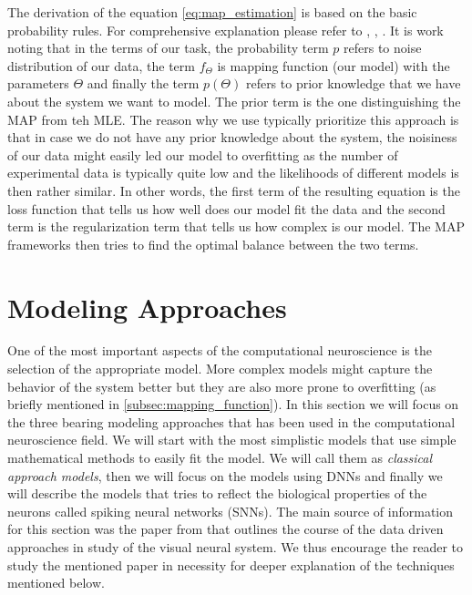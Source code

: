 The derivation of the equation \ref{eq:map_estimation} is based on the basic probability
rules. For comprehensive explanation please refer to \citet{alpaydin2020introduction}, 
\citet{wu2006complete}, \citet{annurev:/content/journals/10.1146/annurev-vision-091718-014731}.
It is work noting that in the terms of our task, the probability term $p$ refers to 
noise distribution of our data, the term $f_{\Theta}$ is mapping function (our model) 
with the parameters $\Theta$ and finally the term $p(\Theta)$ refers to prior knowledge 
that we have about the system we want to model. The prior term is the one distinguishing
the MAP from teh MLE. The reason why we use typically prioritize this approach is that in
case we do not have any prior knowledge about the system, the noisiness of our data 
might easily led our model to overfitting as the number of experimental data is typically
quite low and the likelihoods of different models is then rather similar. In other words,
the first term of the resulting equation is the loss function that tells us how well 
does our model fit the data and the second term is the regularization term that tells 
us how complex is our model. The MAP frameworks then tries to find the optimal 
balance between the two terms.


\section{Modeling Approaches}
\label{sec:modeling_approaches}
One of the most important aspects of the computational neuroscience is the selection
of the appropriate model. More complex models might capture the behavior of the system
better but they are also more prone to overfitting (as briefly mentioned in 
\ref{subsec:mapping_function}). In this section we will focus on the three bearing 
modeling approaches that has been used in the computational neuroscience field. We 
will start with the most simplistic models that use simple mathematical methods to easily fit the model. We will call them as \emph{classical approach models},
then we will focus on the models using DNNs and finally we will describe the 
models that tries to reflect the biological properties of the neurons called 
spiking neural networks (SNNs). The main source of information for this section was the paper from \citet{annurev:/content/journals/10.1146/annurev-vision-091718-014731} that outlines the course of the data driven approaches in study of the visual neural system. We thus encourage the reader to study the mentioned paper in necessity for deeper explanation of the techniques mentioned below.

